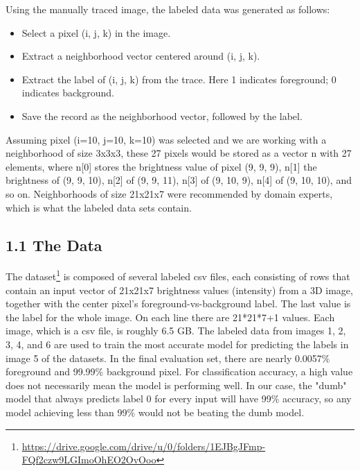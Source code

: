 \documentclass{neu_handout}
\begin{document}
Using the manually traced image, the labeled data was generated as follows:
\newenvironment{myitemize}
{ \begin{itemize}
    \setlength{\itemsep}{0pt}
    \setlength{\parskip}{0pt}
    \setlength{\parsep}{0pt}     }
{ \end{itemize}                  } 

\begin{myitemize}
  \item Select a pixel (i, j, k) in the image.
  \item Extract a neighborhood vector centered around (i, j, k).
  \item Extract the label of (i, j, k) from the trace. Here 1 indicates foreground; 0 indicates background.
  \item  Save the record as the neighborhood vector, followed by the label.
\end{myitemize}

Assuming pixel (i=10, j=10, k=10) was selected and we are working with a neighborhood of size 3x3x3, these 27 pixels would be stored as a vector n with 27 elements, where n[0] stores the brightness value of
pixel (9, 9, 9), n[1] the brightness of (9, 9, 10), n[2] of (9, 9, 11), n[3] of (9, 10, 9), n[4] of (9, 10, 10), and so on. Neighborhoods of size 21x21x7 were recommended by domain experts, which is what the labeled data sets contain.\\

\subsection*{1.1 The Data}
The dataset\footnote{\url{https://drive.google.com/drive/u/0/folders/1EJBgJFmp-FQf2czw9LGImoOhEO2OvOoo}} is composed of several labeled csv files, each consisting of rows that contain an input vector of 21x21x7
brightness values (intensity) from a 3D image, together with the center pixel's foreground-vs-background label. The last value is the label for the whole image. On each line there are 21*21*7+1 values. Each image, which is a csv file, is roughly 6.5 GB. The labeled data from images 1, 2, 3, 4, and 6 are used to train the most accurate model for predicting the labels in image 5 of the datasets. In the final evaluation set, there are nearly 0.0057\% foreground and 99.99\% background pixel. For classification accuracy, a high value does not necessarily mean the model is performing well. In our case, the "dumb" model that always predicts label 0 for every input will have 99\% accuracy, so any model achieving less than 99\% would not be beating the dumb model. \\
\end{document}
